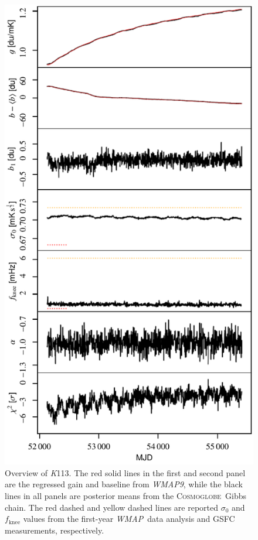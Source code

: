 \documentclass[twocolumn]{../../common/aa}
\def\WMAP{\emph{WMAP}}
\def\WMAPnine{\emph{WMAP9}}
\newcommand{\cosmoglobe}{\textsc{Cosmoglobe}}
\newcommand{\K}[0]{\textit K}
\begin{document}
\begin{figure}[t]
	\centering
	\includegraphics[width=\linewidth]{figures/instpar_CG_K113_v1.pdf}
	\caption{Overview of \K113. The red solid lines in the first and second panel  are the regressed gain and baseline from \WMAPnine, while the black lines in all panels are posterior means from the \cosmoglobe\ Gibbs chain. The red dashed and yellow dashed lines are reported $\sigma_0$ and $f_\mathrm{knee}$ values from the first-year \WMAP\ data analysis and GSFC measurements, respectively.}
	\label{fig:inst_K113}
\end{figure}
\end{document}
